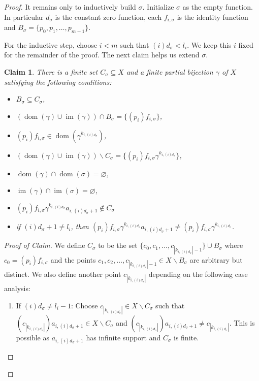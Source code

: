 \documentclass[10pt,a4paper]{amsart}
\newtheorem{claim}{Claim}
\newcommand{\dom}{\operatorname{dom}}
\newcommand{\im}{\operatorname{im}}
\begin{document}
\begin{proof}
     It remains only to inductively build \(\sigma\).
     Initialize \(\sigma\) as the empty function. In particular \(d_\sigma\) is the constant zero function, each \(f_{i,\sigma}\) is the identity function and \(B_{\sigma}=\{p_0,p_1,\ldots, p_{m-1}\}\).
     
     For the inductive step, choose \(i<m\) such that \((i)d_{\sigma}<l_i\). We keep this \(i\) fixed for the remainder of the proof. The next claim helps us extend \(\sigma\).
     \begin{claim}
         There is a finite set \(C_\sigma\subseteq X\) and a finite partial bijection \(\gamma\) of \(X\) satisfying the following conditions:
         \begin{itemize}
             \item \(B_\sigma\subseteq C_\sigma\), 
             \item \((\dom(\gamma)\cup \im(\gamma))\cap B_{\sigma}=\{(p_i)f_{i,\sigma}\}\),
             \item \((p_i)f_{i,\sigma}\in \dom(\gamma^{k_{i,(i)d_{\sigma}}})\), 
             \item \((\dom(\gamma)\cup \im(\gamma))\backslash C_\sigma=\{(p_i)f_{i,\sigma}\gamma^{k_{i,(i)d_{\sigma}}}\}\), 
             \item \(\dom(\gamma)\cap \dom(\sigma)=\varnothing\),
             \item  \(\im(\gamma)\cap \im(\sigma)=\varnothing\),
             \item \((p_i)f_{i,\sigma}\gamma^{k_{i,(i)d_{\sigma}}}a_{i, (i)d_{\sigma}+1}\notin C_\sigma\)
             \item if \((i)d_{\sigma}+1\neq l_i\), then \((p_i)f_{i,\sigma}\gamma^{k_{i,(i)d_{\sigma}}}a_{i, (i)d_{\sigma}+1}\neq  (p_i)f_{i,\sigma}\gamma^{k_{i,(i)d_{\sigma}}}\).
         \end{itemize} 
     \end{claim}
     \begin{proof}[Proof of Claim]
     We define \(C_\sigma\) to be the set \(\{c_0,c_1,\ldots, c_{|k_{i,(i)d_{\sigma}}|-1}\}\cup B_{\sigma}\) where \(c_0=(p_i)f_{i,\sigma}\) and the points \(c_1,c_2,\ldots,c_{|k_{i,(i)d_{\sigma}}|-1}\in X\backslash B_\sigma\) are arbitrary but distinct.
     We also define another point \(c_{|k_{i,(i)d_{\sigma}}|}\) depending on the following case analysis:
     \begin{enumerate}
         \item[(i)] If \((i)d_\sigma\neq l_i-1\): 
         Choose \(c_{|k_{i,(i)d_{\sigma}}|}\in X\backslash C_\sigma\) such that \((c_{|k_{i,(i)d_{\sigma}}|})a_{i,(i)d_{\sigma}+1}\in X\backslash C_\sigma\) and  \((c_{|k_{i,(i)d_{\sigma}}|})a_{i,(i)d_{\sigma}+1}\neq c_{|k_{i,(i)d_{\sigma}}|}\). This is possible as \(a_{i,(i)d_{\sigma}+1}\) has infinite support and \(C_\sigma\) is finite.
       

\end{enumerate}
\end{proof}
\end{proof}
\end{document}
